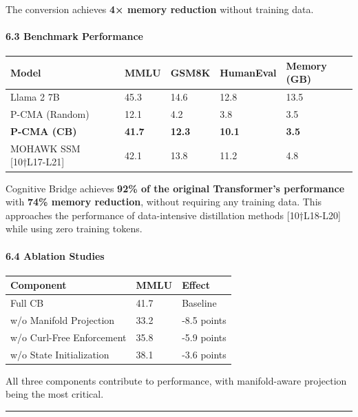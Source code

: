 \documentclass[
  11pt,
  a4paper,
]{article}
\begin{document}
The conversion achieves \textbf{4× memory reduction} without training
data.

\paragraph{6.3 Benchmark Performance}\label{benchmark-performance}

\begin{longtable}[]{@{}lllll@{}}
\toprule\noalign{}
Model & MMLU & GSM8K & HumanEval & Memory (GB) \\
\midrule\noalign{}
\endhead
\bottomrule\noalign{}
\endlastfoot
Llama 2 7B & 45.3 & 14.6 & 12.8 & 13.5 \\
P-CMA (Random) & 12.1 & 4.2 & 3.8 & 3.5 \\
\textbf{P-CMA (CB)} & \textbf{41.7} & \textbf{12.3} & \textbf{10.1} &
\textbf{3.5} \\
MOHAWK SSM {[}10†L17-L21{]} & 42.1 & 13.8 & 11.2 & 4.8 \\
\end{longtable}

Cognitive Bridge achieves \textbf{92\% of the original Transformer's
performance} with \textbf{74\% memory reduction}, without requiring any
training data. This approaches the performance of data-intensive
distillation methods {[}10†L18-L20{]} while using zero training tokens.

\paragraph{6.4 Ablation Studies}\label{ablation-studies}

\begin{longtable}[]{@{}lll@{}}
\toprule\noalign{}
Component & MMLU & Effect \\
\midrule\noalign{}
\endhead
\bottomrule\noalign{}
\endlastfoot
Full CB & 41.7 & Baseline \\
w/o Manifold Projection & 33.2 & -8.5 points \\
w/o Curl-Free Enforcement & 35.8 & -5.9 points \\
w/o State Initialization & 38.1 & -3.6 points \\
\end{longtable}

All three components contribute to performance, with manifold-aware
projection being the most critical.

\begin{center}\rule{0.5\linewidth}{0.5pt}\end{center}
\end{document}
